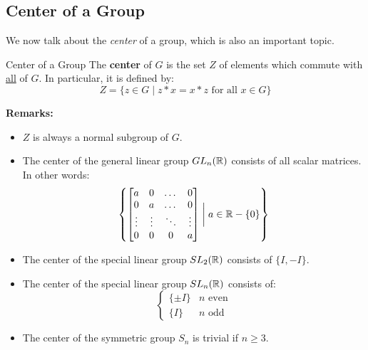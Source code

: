 \documentclass[letterpaper]{article}
\begin{document}
\subsection{Center of a Group}
We now talk about the \emph{center} of a group, which is also an important topic. 

\begin{definition}{Center of a Group}{}
    The \textbf{center} of $G$ is the set $Z$ of elements which commute with \underline{all} of $G$. In particular, it is defined by: 
    \[Z = \{z \in G \mid z * x = x * z \text{ for all } x \in G\}\]
\end{definition}
\textbf{Remarks:}
\begin{itemize}
    \item $Z$ is always a normal subgroup of $G$. 
    \item The center of the general linear group $GL_{n}(\mathbb{R})$ consists of all scalar matrices. In other words:
    \[\left\{\begin{bmatrix}
        a & 0 & \dots & 0 \\ 
        0 & a & \dots & 0 \\ 
        \vdots & \vdots & \ddots & \vdots \\ 
        0 & 0 & 0 & a 
    \end{bmatrix} \mathrel{\bigg|} a \in \mathbb{R} - \{0\}\right\}\]
    \item The center of the special linear group $SL_{2}(\mathbb{R})$ consists of $\{I, -I\}$. 
    \item The center of the special linear group $SL_{n}(\mathbb{R})$ consists of: 
    \[
        \begin{cases}
            \{\pm I\} & n \text{ even} \\ 
            \{I\} & n \text{ odd}
        \end{cases}    
    \]
    \item The center of the symmetric group $S_n$ is trivial if $n \geq 3$.
\end{itemize}
\end{document}
